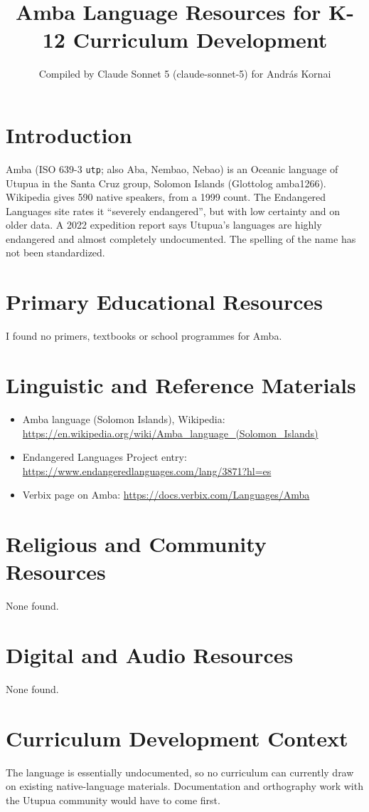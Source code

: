 \documentclass[12pt]{article}
\title{Amba Language Resources for K-12 Curriculum Development}
\author{Compiled by Claude Sonnet 5 (claude-sonnet-5) for Andr\'as Kornai}
\date{}
\begin{document}
\maketitle
\section{Introduction}
Amba (ISO 639-3 \texttt{utp}; also Aba, Nembao, Nebao) is an Oceanic language of Utupua in the Santa Cruz group, Solomon Islands (Glottolog amba1266). Wikipedia gives 590 native speakers, from a 1999 count. The Endangered Languages site rates it ``severely endangered'', but with low certainty and on older data. A 2022 expedition report says Utupua's languages are highly endangered and almost completely undocumented. The spelling of the name has not been standardized.
\section{Primary Educational Resources}
I found no primers, textbooks or school programmes for Amba.
\section{Linguistic and Reference Materials}
\begin{itemize}
\item Amba language (Solomon Islands), Wikipedia: \url{https://en.wikipedia.org/wiki/Amba_language_(Solomon_Islands)}
\item Endangered Languages Project entry: \url{https://www.endangeredlanguages.com/lang/3871?hl=es}
\item Verbix page on Amba: \url{https://docs.verbix.com/Languages/Amba}
\end{itemize}
\section{Religious and Community Resources}
None found.
\section{Digital and Audio Resources}
None found.
\section{Curriculum Development Context}
The language is essentially undocumented, so no curriculum can currently draw on existing native-language materials. Documentation and orthography work with the Utupua community would have to come first.
\end{document}

